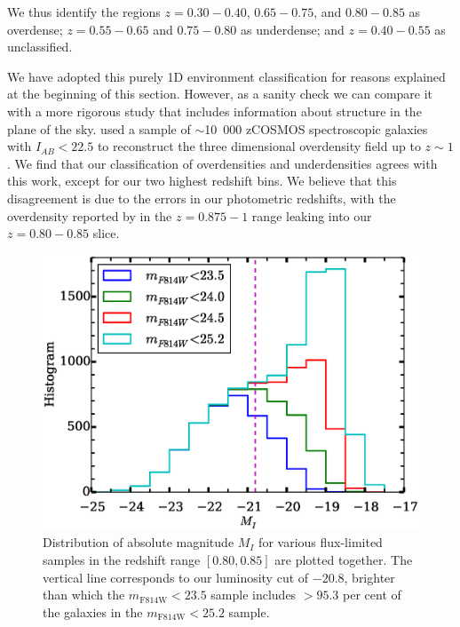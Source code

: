 \documentclass[twocolumn,useAMS,usenatbib]{mn2e}
\newcommand{\claire}[1]{{\textcolor{magenta}{#1}}}
\begin{document}
We thus identify the regions $z=0.30-0.40$, $0.65-0.75$, and
$0.80-0.85$ as overdense; $z=0.55-0.65$ and $0.75-0.80$ as underdense; and $z=0.40-0.55$ as unclassified. 

We have adopted this purely 1D environment classification for reasons
explained at the beginning of this section. However, as a sanity check
we can compare it with a more rigorous study that includes information
about structure in the plane of the sky.  
 \cite{Kovac_Density10k} used a sample of $\sim$10~000 zCOSMOS
 spectroscopic galaxies with $I_{AB}<22.5$ to reconstruct the three dimensional overdensity field up to $z\sim 1$.
We find that our classification of overdensities and underdensities
agrees with this work, except for our two highest redshift bins.
We believe that this disagreement is due to the errors in our
photometric redshifts, with the overdensity reported by
\cite{Kovac_Density10k} in the $z=0.875-1$ range 
leaking into our $z=0.80-0.85$ slice.
\begin{figure}
  \centering
   \includegraphics[width=\columnwidth]{MAG_histograms}
   \caption{Distribution of absolute magnitude $M_I$ for various
     flux-limited samples in the redshift range $[0.80, 0.85]$ are plotted together. The vertical line
     corresponds to our luminosity cut of $-20.8$, brighter than which
     the $m_\text{F814W}<23.5$ sample includes $>95.3$ per cent of the
     galaxies in the $m_\text{F814W}<25.2$ sample.
   }
   \label{fig:MIhist}
 \end{figure}
\end{document}
